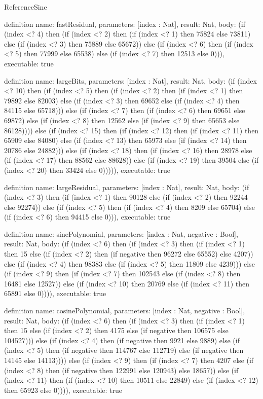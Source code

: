 \begin{lexlean}{ReferenceSine}
\begin{semanticmodule}
definition{
  name: fastResidual,
  parameters: [index : Nat],
  result: Nat,
  body: (if (index <? 4) then (if (index <? 2) then (if (index <? 1) then 75824 else 73811) else (if (index <? 3) then 75889 else 65672)) else (if (index <? 6) then (if (index <? 5) then 77999 else 65538) else (if (index <? 7) then 12513 else 0))),
  executable: true
}

definition{
  name: largeBits,
  parameters: [index : Nat],
  result: Nat,
  body: (if (index <? 10) then (if (index <? 5) then (if (index <? 2) then (if (index <? 1) then 79892 else 82003) else (if (index <? 3) then 69652 else (if (index <? 4) then 84115 else 65718))) else (if (index <? 7) then (if (index <? 6) then 69651 else 69872) else (if (index <? 8) then 12562 else (if (index <? 9) then 65653 else 86128)))) else (if (index <? 15) then (if (index <? 12) then (if (index <? 11) then 65909 else 84080) else (if (index <? 13) then 65973 else (if (index <? 14) then 20786 else 24882))) else (if (index <? 18) then (if (index <? 16) then 28978 else (if (index <? 17) then 88562 else 88628)) else (if (index <? 19) then 39504 else (if (index <? 20) then 33424 else 0))))),
  executable: true
}

definition{
  name: largeResidual,
  parameters: [index : Nat],
  result: Nat,
  body: (if (index <? 3) then (if (index <? 1) then 90128 else (if (index <? 2) then 92244 else 92274)) else (if (index <? 5) then (if (index <? 4) then 8209 else 65704) else (if (index <? 6) then 94415 else 0))),
  executable: true
}

definition{
  name: sinePolynomial,
  parameters: [index : Nat, negative : Bool],
  result: Nat,
  body: (if (index <? 6) then (if (index <? 3) then (if (index <? 1) then 15 else (if (index <? 2) then (if negative then 96272 else 65552) else 4207)) else (if (index <? 4) then 98383 else (if (index <? 5) then 11809 else 4239))) else (if (index <? 9) then (if (index <? 7) then 102543 else (if (index <? 8) then 16481 else 12527)) else (if (index <? 10) then 20769 else (if (index <? 11) then 65891 else 0)))),
  executable: true
}

definition{
  name: cosinePolynomial,
  parameters: [index : Nat, negative : Bool],
  result: Nat,
  body: (if (index <? 6) then (if (index <? 3) then (if (index <? 1) then 15 else (if (index <? 2) then 4175 else (if negative then 106575 else 104527))) else (if (index <? 4) then (if negative then 9921 else 9889) else (if (index <? 5) then (if negative then 114767 else 112719) else (if negative then 14145 else 14113)))) else (if (index <? 9) then (if (index <? 7) then 4207 else (if (index <? 8) then (if negative then 122991 else 120943) else 18657)) else (if (index <? 11) then (if (index <? 10) then 10511 else 22849) else (if (index <? 12) then 65923 else 0)))),
  executable: true
}


\end{semanticmodule}
\end{lexlean}
